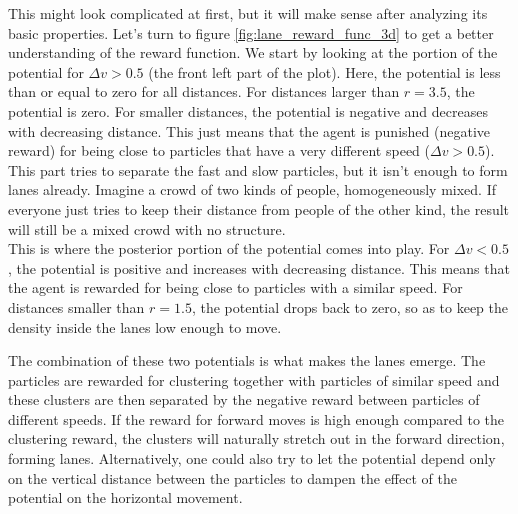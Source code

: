 This might look complicated at first, but it will make sense after analyzing its basic properties. Let's turn to figure \ref{fig:lane_reward_func_3d} to get a better understanding of the reward function. We start by looking at the portion of the potential for $\Delta v > 0.5$ (the front left part of the plot). Here, the potential is less than or equal to zero for all distances. For distances larger than $r=3.5$, the potential is zero. For smaller distances, the potential is negative and decreases with decreasing distance. This just means that the agent is punished (negative reward) for being close to particles that have a very different speed ($\Delta v > 0.5$). This part tries to separate the fast and slow particles, but it isn't enough to form lanes already. Imagine a crowd of two kinds of people, homogeneously mixed. If everyone just tries to keep their distance from people of the other kind, the result will still be a mixed crowd with no structure.
\\
This is where the posterior portion of the potential comes into play. For $\Delta v < 0.5$, the potential is positive and increases with decreasing distance. This means that the agent is rewarded for being close to particles with a similar speed. For distances smaller than $r=1.5$, the potential drops back to zero, so as to keep the density inside the lanes low enough to move.


The combination of these two potentials is what makes the lanes emerge. The particles are rewarded for clustering together with particles of similar speed and these clusters are then separated by the negative reward between particles of different speeds. If the reward for forward moves is high enough compared to the clustering reward, the clusters will naturally stretch out in the forward direction, forming lanes. Alternatively, one could also try to let the potential depend only on the vertical distance between the particles to dampen the effect of the potential on the horizontal movement. 

